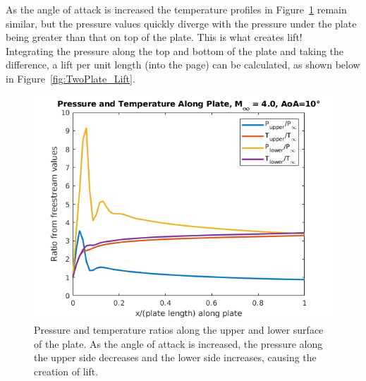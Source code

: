 \documentclass[10pt,a4paper]{article}
\begin{document}
\FloatBarrier

As the angle of attack is increased the temperature profiles in Figure~\ref{fig:TwoPlate_PresTemp_10AoA} remain similar, but the pressure values quickly diverge with the pressure under the plate being greater than that on top of the plate. This is what creates lift!\\

Integrating the pressure along the top and bottom of the plate and taking the difference, a lift per unit length (into the page) can be calculated, as shown below in Figure~\ref{fig:TwoPlate_Lift}.




\begin{figure}[!htb]
	\begin{center}
		\includegraphics[scale=0.7]{images/TwoPlate_PresTemp_10AoA.png} 
		\caption{Pressure and temperature ratios along the upper and lower surface of the plate. As the angle of attack is increased, the pressure along the upper side decreases and the lower side increases, causing the creation of lift.}
		\label{fig:TwoPlate_PresTemp_10AoA}
	\end{center}
\end{figure}
\end{document}
